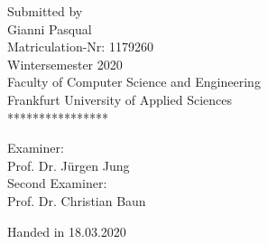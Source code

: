 \documentclass[a4paper,11pt, pagesize]{scrartcl}
\begin{document}
\begin{spacing}{1.2}
\begin{spacing}{1}
\begin{titlepage}
\begin{center}
           \begin{center} 
             \vspace{1cm} Submitted by\\
             \vspace{0.3cm} {\large Gianni Pasqual}\\
             \vspace{1cm} Matriculation-Nr: 1179260\\
             Wintersemester 2020 \\
             Faculty of Computer Science and Engineering\\
             Frankfurt University of Applied Sciences\\
             \vspace{0.5cm} **************** \vfill
          \end{center}
          {\large Examiner:\\Prof. Dr. Jürgen Jung}\\
          {\large Second Examiner:\\Prof. Dr. Christian Baun}
          
          \vfill
          
          Handed in 18.03.2020
      
    \end{center}
    

\end{titlepage}
\end{spacing}
\end{spacing}
\end{document}
